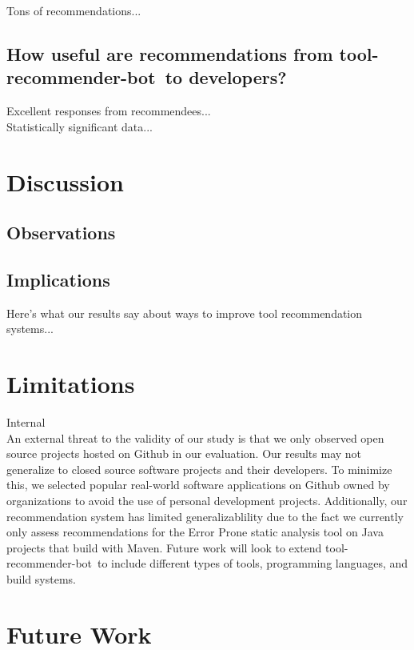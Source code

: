 \documentclass[conference]{IEEEtran}
\newcommand{\tool}{tool-recommender-bot}
\begin{document}
Tons of recommendations... \\

\subsection{How useful are recommendations from \tool~to developers?}

Excellent responses from recommendees...\\

Statistically significant data...

\section{Discussion}

\subsection{Observations}

\subsection{Implications}

Here's what our results say about ways to improve tool recommendation systems...

\section{Limitations}

Internal\\

An external threat to the validity of our study is that we only observed open source projects hosted on Github in our evaluation. Our results may not generalize to closed source software projects and their developers. To minimize this, we selected popular real-world software applications on Github owned by organizations to avoid the use of personal development projects. Additionally, our recommendation system has limited generalizablility due to the fact we currently only assess recommendations for the Error Prone static analysis tool on Java projects that build with Maven. Future work will look to extend \tool~to include different types of tools, programming languages, and build systems.

\section{Future Work}
\end{document}
